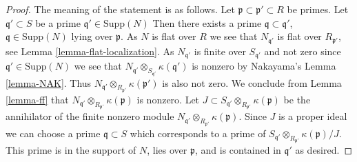 \begin{proof}
The meaning of the statement is as follows. Let
$\mathfrak p \subset \mathfrak p' \subset R$ be primes. Let
$\mathfrak q' \subset S$ be a prime $\mathfrak q' \in \text{Supp}(N)$
Then there exists a prime $\mathfrak q \subset \mathfrak q'$,
$\mathfrak q \in \text{Supp}(N)$ lying over $\mathfrak p$.
As $N$ is flat over $R$ we see that $N_{\mathfrak q'}$ is flat
over $R_{\mathfrak p'}$, see Lemma \ref{lemma-flat-localization}.
As $N_{\mathfrak q'}$ is finite over $S_{\mathfrak q'}$
and not zero since $\mathfrak q' \in \text{Supp}(N)$ we see
that $N_{\mathfrak q'} \otimes_{S_{\mathfrak q'}} \kappa(\mathfrak q')$
is nonzero by Nakayama's Lemma \ref{lemma-NAK}.
Thus $N_{\mathfrak q'} \otimes_{R_{\mathfrak p'}} \kappa(\mathfrak p')$
is also not zero. We conclude from Lemma \ref{lemma-ff}
that $N_{\mathfrak q'} \otimes_{R_{\mathfrak p'}} \kappa(\mathfrak p)$
is nonzero. Let
$J \subset S_{\mathfrak q'} \otimes_{R_{\mathfrak p'}} \kappa(\mathfrak p)$
be the annihilator of the finite nonzero module
$N_{\mathfrak q'} \otimes_{R_{\mathfrak p'}} \kappa(\mathfrak p)$.
Since $J$ is a proper ideal we can choose a prime $\mathfrak q \subset S$
which corresponds to a prime of
$S_{\mathfrak q'} \otimes_{R_{\mathfrak p'}} \kappa(\mathfrak p)/J$.
This prime is in the support of $N$, lies over $\mathfrak p$, and
is contained in $\mathfrak q'$ as desired.
\end{proof}























